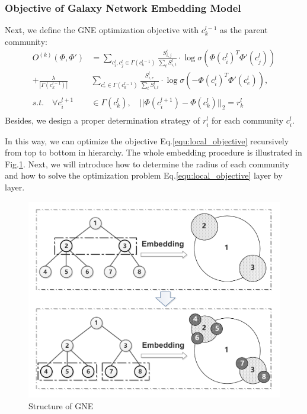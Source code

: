 \documentclass{article}
\theoremstyle{definition}
\begin{document}
	
	\subsubsection{Objective of Galaxy Network Embedding Model}
	Next, we define the GNE optimization objective with $c_k^{l-1}$ as the parent community:
	\begin{equation}
	  \label{equ:local_objective}
	  \begin{split}
	  O^{(k)}(\Phi, \Phi') & = \sum_{c_i^l, c_j^l \in \Gamma(c_k^{l-1})} \frac{S_{i,j}^l}{\sum_t S_{i, t}^l} \cdot \log{\sigma(\Phi(c_i^l)^T \Phi'(c_j^l))} \\
		 + \frac{\lambda}{|\Gamma(c_k^{l-1})|}&\sum_{c_e^l \in \Gamma(c_k^{l-1})} \frac{S_{i, e}^l}{\sum_t S_{i, t}^l} \cdot \log{\sigma(-\Phi(c_i^l)^T \Phi'(c_e^l))}, \\
		 \\
		s.t. \quad \forall c_i^{l+1} & \in \Gamma(c_k^l),\quad || \Phi(c_i^{l+1})  - \Phi(c_k^l)||_2= r_k^l \\
	  \end{split}
	  \end{equation}
	Besides, we design a proper determination strategy of $r_i^l$ for each community $c_i^l$.

	In this way, we can optimize the objective Eq.\ref{equ:local_objective} recursively from top to bottom in hierarchy. The whole embedding procedure is illustrated in Fig.\ref{fig:structure}. Next, we will introduce how to determine the radius of each community and how to solve the optimization problem Eq.\ref{equ:local_objective} layer by layer.
	\begin{figure}[ht]
	 	\centering
		\includegraphics[width=0.6\linewidth]{figure/Structure.pdf}
		\caption{Structure of GNE}
		\label{fig:structure}
	 \end{figure}
\end{document}
